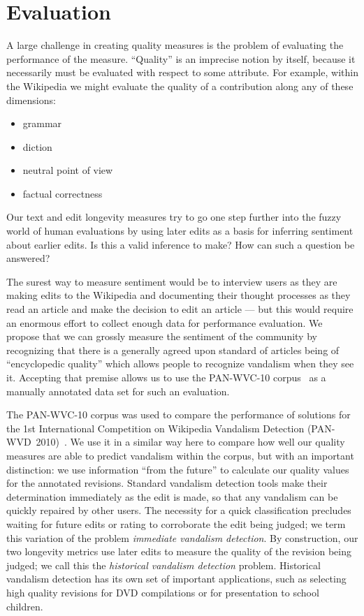 \section{Evaluation}

A large challenge in creating quality measures is the
problem of evaluating the performance of the measure.
``Quality'' is an imprecise notion by itself, because it
necessarily must be evaluated with respect to some attribute.
For example, within the Wikipedia we might evaluate the quality
of a contribution along any of these dimensions:
\begin{itemize}
\item grammar
\item diction
\item neutral point of view
\item factual correctness
\end{itemize}
Our text and edit longevity measures try to go one step
further into the fuzzy world of human evaluations by using
later edits as a basis for inferring sentiment about earlier edits.
Is this a valid inference to make?
How can such a question be answered?

The surest way to measure sentiment would be to interview
users as they are making edits to the Wikipedia and documenting
their thought processes as they read an article and make the
decision to edit an article --- but this would require an enormous
effort to collect enough data for performance evaluation.
We propose that we can grossly measure the sentiment of the
community by recognizing that there is a generally agreed upon
standard of articles being of ``encyclopedic quality''
which allows people to recognize vandalism when they see it.
Accepting that premise allows us to use the PAN-WVC-10
corpus~\cite{Potthast2010a} as a manually annotated data set for
such an evaluation.

The PAN-WVC-10 corpus was used to compare the performance of
solutions for the 1st International Competition on Wikipedia
Vandalism Detection (PAN-WVD~2010)~\cite{Potthast2010b}.
We use it in a similar way here to compare how well our quality
measures are able to predict vandalism within the corpus,
but with an important distinction:
we use information ``from the future'' to calculate our
quality values for the annotated revisions.
Standard vandalism detection tools make their determination
immediately as the edit is made, so that any vandalism can be
quickly repaired by other users.
The necessity for a quick classification precludes waiting
for future edits or rating to corroborate the edit being judged;
we term this variation of the problem \textit{immediate vandalism detection}.
By construction, our two longevity metrics use later edits to
measure the quality of the revision being judged; we call
this the \textit{historical vandalism detection} problem.
Historical vandalism detection has its own set of important
applications, such as selecting high quality revisions for
DVD compilations or for presentation to school children.

